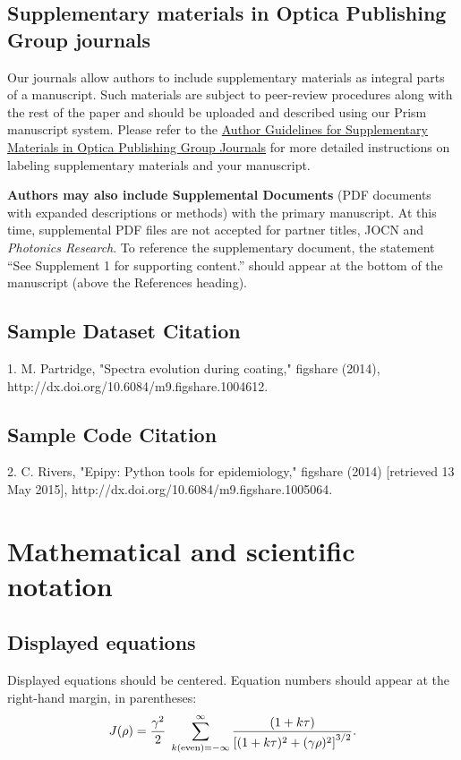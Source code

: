 \documentclass{optica-article}
\begin{document}
\subsection{Supplementary materials in Optica Publishing Group journals}
Our journals allow authors to include supplementary materials as integral parts
of a manuscript. Such materials are subject to peer-review procedures along
with the rest of the paper and should be uploaded and described using our Prism
manuscript system. Please refer to the
\href{https://opg.optica.org/submit/style/supplementary_materials.cfm}
{Author Guidelines for Supplementary Materials in Optica Publishing Group Journals}
for more detailed instructions on labeling supplementary materials and your manuscript.

\textbf{Authors may also include Supplemental Documents}
(PDF documents with expanded descriptions or methods) with the primary manuscript.
At this time, supplemental PDF files are not accepted for partner titles, JOCN
and \emph{Photonics Research}. To reference the supplementary document, the
statement ``See Supplement 1 for supporting content.'' should appear at the
bottom of the manuscript (above the References heading).

\subsection{Sample Dataset Citation}

1. M. Partridge, "Spectra evolution during coating," figshare (2014),
http://dx.doi.org/10.6084/m9.figshare.1004612.

\subsection{Sample Code Citation}

2. C. Rivers, "Epipy: Python tools for epidemiology," figshare (2014)
[retrieved 13 May 2015], http://dx.doi.org/10.6084/m9.figshare.1005064.



\section{Mathematical and scientific notation}

\subsection{Displayed equations} Displayed equations should be centered.
Equation numbers should appear at the right-hand margin, in
parentheses:
\begin{equation}
	J(\rho) =
	\frac{\gamma^2}{2} \; \sum_{k({\rm even}) = -\infty}^{\infty}
	\frac{(1 + k \tau)}{ \left[ (1 + k \tau)^2 + (\gamma  \rho)^2  \right]^{3/2} }.
\end{equation}
\end{document}
